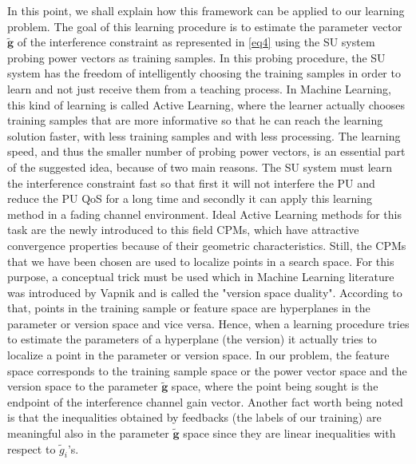\documentclass[journal]{IEEEtran}
\begin{document}
In this point, we shall explain how this framework can be applied to our learning problem. The goal of this learning procedure is to estimate the parameter vector $\mathbf{\tilde{g}}$ of the interference constraint as represented in \eqref{eq4} using the SU system probing power vectors as training samples. In this probing procedure, the SU system has the freedom of intelligently choosing the training samples in order to learn and not just receive them from a teaching process. In Machine Learning, this kind of learning is called Active Learning, where the learner actually chooses training samples that are more informative so that he can reach the learning solution faster, with less training samples and with less processing. The learning speed, and thus the smaller number of probing power vectors, is an essential part of the suggested idea, because of two main reasons. The SU system must learn the interference constraint fast so that first it will not interfere the PU and reduce the PU QoS for a long time and secondly it can apply this learning method in a fading channel environment. Ideal Active Learning methods for this task are the newly introduced to this field CPMs, which have attractive convergence properties because of their geometric characteristics. Still, the CPMs that we have been chosen are used to localize points in a search space. For this purpose, a conceptual trick must be used which in Machine Learning literature was introduced by Vapnik \cite{biban29} and is called the "version space duality". According to that, points in the training sample or feature space are hyperplanes in the parameter or version space and vice versa. Hence, when a learning procedure tries to estimate the parameters of a hyperplane (the version) it actually tries to localize a point in the parameter or version space. In our problem, the feature space corresponds to the training sample space or the power vector space and the version space to the parameter $\mathbf{\tilde{g}}$ space, where the point being sought is the endpoint of the interference channel gain vector. Another fact worth being noted is that the inequalities obtained by feedbacks (the labels of our training) are meaningful also in the parameter $\mathbf{\tilde{g}}$ space since they are linear inequalities with respect to $\tilde{g}_{i}$'s.
\end{document}
